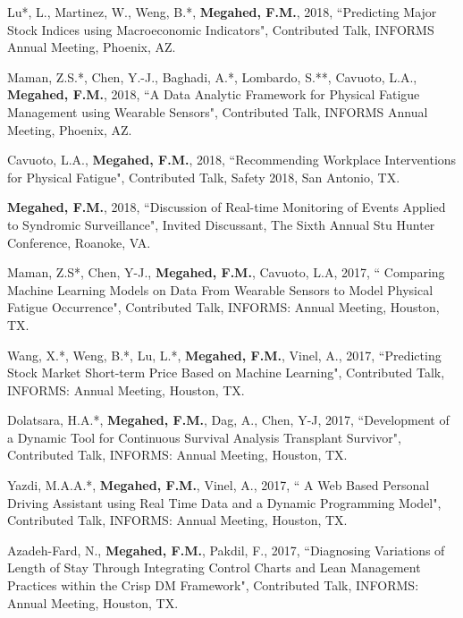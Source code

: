 \documentclass[margin,line]{res}
\begin{document}
\begin{resume}
\vspace{-1.5mm} 
Lu*, L., Martinez, W., Weng, B.*, \textbf{Megahed, F.M.}, 2018, ``Predicting Major Stock Indices using Macroeconomic Indicators", Contributed Talk, INFORMS Annual Meeting, Phoenix, AZ.

\vspace{-1.5mm}
Maman, Z.S.*, Chen, Y.-J., Baghadi, A.*, Lombardo, S.**, Cavuoto, L.A., \textbf{Megahed, F.M.}, 2018, ``A Data Analytic Framework for Physical Fatigue Management using Wearable Sensors", Contributed Talk, INFORMS Annual Meeting, Phoenix, AZ.

\vspace{-1.5mm}
Cavuoto, L.A., \textbf{Megahed, F.M.}, 2018, ``Recommending Workplace Interventions for Physical Fatigue", Contributed Talk, Safety 2018, San Antonio, TX.

\vspace{-1.5mm}
\textbf{Megahed, F.M.}, 2018, ``Discussion of Real-time Monitoring of Events Applied to Syndromic Surveillance", Invited Discussant, The Sixth Annual Stu Hunter Conference, Roanoke, VA. 

\vspace{-1.5mm}
Maman, Z.S*, Chen, Y-J., \textbf{Megahed, F.M.}, Cavuoto, L.A, 2017, `` Comparing Machine Learning Models on Data From Wearable Sensors to Model Physical Fatigue Occurrence", Contributed Talk, INFORMS: Annual Meeting, Houston, TX.

\vspace{-1.5mm}
Wang, X.*, Weng, B.*, Lu, L.*, \textbf{Megahed, F.M.}, Vinel, A., 2017, ``Predicting Stock Market Short-term Price Based on Machine Learning",  Contributed Talk, INFORMS: Annual Meeting, Houston, TX.

\vspace{-1.5mm}
Dolatsara, H.A.*, \textbf{Megahed, F.M.}, Dag, A., Chen, Y-J, 2017, ``Development of a Dynamic Tool for Continuous Survival Analysis Transplant Survivor", Contributed Talk, INFORMS: Annual Meeting, Houston, TX.

\vspace{-1.5mm}
Yazdi, M.A.A.*, \textbf{Megahed, F.M.}, Vinel, A., 2017, `` A Web Based Personal Driving Assistant using Real Time Data and a Dynamic Programming Model", Contributed Talk, INFORMS: Annual Meeting, Houston, TX.

\vspace{-1.5mm}
Azadeh-Fard, N., \textbf{Megahed, F.M.}, Pakdil, F., 2017, ``Diagnosing Variations of Length of Stay Through Integrating Control Charts and Lean Management Practices within the Crisp DM Framework", Contributed Talk, INFORMS: Annual Meeting, Houston, TX.


\end{resume}
\end{document}
